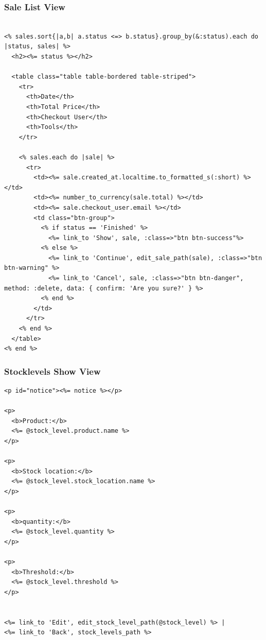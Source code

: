 \documentclass[a4paper]{article}
\begin{document}
\subsubsection{Sale List View}
\begin{verbatim}

<% sales.sort{|a,b| a.status <=> b.status}.group_by(&:status).each do |status, sales| %>
  <h2><%= status %></h2>

  <table class="table table-bordered table-striped">
    <tr>
      <th>Date</th>
      <th>Total Price</th>
      <th>Checkout User</th>
      <th>Tools</th>
    </tr>

    <% sales.each do |sale| %>
      <tr>
        <td><%= sale.created_at.localtime.to_formatted_s(:short) %></td>
        <td><%= number_to_currency(sale.total) %></td>
        <td><%= sale.checkout_user.email %></td>
        <td class="btn-group">
          <% if status == 'Finished' %>
            <%= link_to 'Show', sale, :class=>"btn btn-success"%>
          <% else %>
            <%= link_to 'Continue', edit_sale_path(sale), :class=>"btn btn-warning" %>
            <%= link_to 'Cancel', sale, :class=>"btn btn-danger", method: :delete, data: { confirm: 'Are you sure?' } %>
          <% end %>
        </td>
      </tr>
    <% end %>
  </table>
<% end %>

\end{verbatim}
\subsubsection{Stocklevels Show View}
\begin{verbatim}
<p id="notice"><%= notice %></p>

<p>
  <b>Product:</b>
  <%= @stock_level.product.name %>
</p>

<p>
  <b>Stock location:</b>
  <%= @stock_level.stock_location.name %>
</p>

<p>
  <b>quantity:</b>
  <%= @stock_level.quantity %>
</p>

<p>
  <b>Threshold:</b>
  <%= @stock_level.threshold %>
</p>


<%= link_to 'Edit', edit_stock_level_path(@stock_level) %> |
<%= link_to 'Back', stock_levels_path %>

\end{verbatim}
\end{document}
